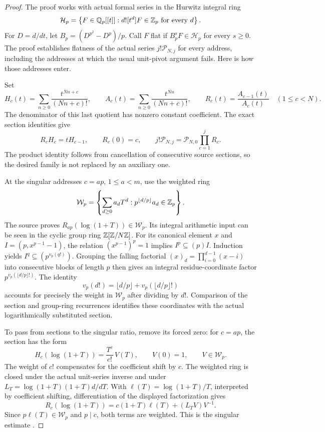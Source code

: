 \begin{proof}
The proof works with actual formal series in the Hurwitz integral ring
\[
 \mathcal H_p=\left\{F\in\mathbb Q_p[[t]]:
            d![t^d]F\in\mathbb Z_p\text{ for every }d\right\}.
\]
For $D=d/dt$, let $B_p=(D^{p^2}-D^p)/p$.  Call $F$ flat if
$B_p^sF\in\mathcal H_p$ for every $s\ge0$.
The proof establishes flatness of the actual series $j!\mathcal P_{N,j}$ for every
address, including the addresses at which the usual unit-pivot argument
fails.  Here is how those addresses enter.

Set
\[
 H_c(t)=\sum_{n\ge0}\frac{t^{Nn+c}}{(Nn+c)!},\qquad
 A_c(t)=\sum_{n\ge0}\frac{t^{Nn}}{(Nn+c)!},\qquad
 R_c(t)=\frac{A_{c-1}(t)}{A_c(t)}\quad(1\le c<N).
\]
The denominator of this last quotient has nonzero constant coefficient.
The exact section identities give
\[
 R_cH_c=tH_{c-1},\qquad R_c(0)=c,\qquad
 j!\mathcal P_{N,j}=\mathcal P_{N,0}\prod_{c=1}^{j}R_c.
\]
The product identity follows from cancellation of consecutive source
sections, so the desired family is not replaced by an auxiliary one.

At the singular addresses $c=ap$, $1\le a<m$, use the weighted ring
\[
 \mathcal W_p=\left\{\sum_{d\ge0}a_dT^d:
          p^{\lfloor d/p\rfloor}a_d\in\mathbb Z_p\right\}.
\]
The source proves $R_{ap}(\log(1+T))\in\mathcal W_p$.  Its integral
arithmetic input can be seen in the cyclic group ring $\mathbb Z[\mathbb Z/N\mathbb Z]$.
For its canonical element $x$ and $I=(p,x^{p-1}-1)$, the relation
$(x^{p-1})^p=1$ implies $I^p\subseteq(p)I$.  Induction yields
$I^q\subseteq(p^{v_p(q!)})$.  Grouping the falling factorial
$(x)_d=\prod_{i=0}^{d-1}(x-i)$ into consecutive blocks of length $p$
then gives an integral residue-coordinate factor
$p^{v_p(\lfloor d/p\rfloor!)}$.  The identity
\[
 v_p(d!)=\lfloor d/p\rfloor+v_p(\lfloor d/p\rfloor!)
\]
accounts for precisely the weight in $\mathcal W_p$ after dividing by $d!$.
Comparison of the section and group-ring recurrences identifies these
coordinates with the actual logarithmically substituted section.

To pass from sections to the singular ratio, remove its forced zero:
for $c=ap$, the section has the form
\[
 H_c(\log(1+T))=\frac{T^c}{c!}\,V(T),\qquad V(0)=1,
 \qquad V\in\mathcal W_p.
\]
The weight of $c!$ compensates for the coefficient shift by $c$.
The weighted ring is closed under the actual unit-series inverse and under
$L_T=\log(1+T)(1+T)d/dT$.  With
$\ell(T)=\log(1+T)/T$, interpreted by coefficient shifting, differentiation
of the displayed factorization gives
\[
 R_c(\log(1+T))=c(1+T)\ell(T)+(L_TV)V^{-1}.
\]
Since $p\ell(T)\in\mathcal W_p$ and $p\mid c$, both terms are weighted.
This is the singular estimate
.


\end{proof}
